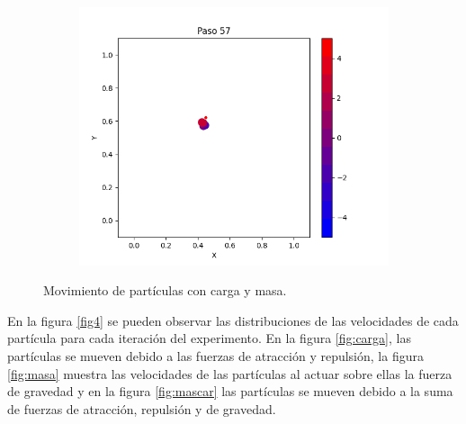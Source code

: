 \documentclass{report}
\begin{document}
\begin{figure}[h]
\begin{subfigure}[b]{0.3\textwidth}
         \includegraphics[width=\textwidth]{Images/Images_mc/p9pmc_t57.png}
     \end{subfigure}
     \caption{Movimiento de part\'iculas con carga y masa.}
     \label{fig3}
\end{figure}

\newpage

En la figura \ref{fig4} se pueden observar las distribuciones de las velocidades de cada part\'icula para cada iteraci\'on del experimento. En la figura \ref{fig:carga}, las part\'iculas se mueven debido a las fuerzas de atracci\'on y repulsi\'on, la figura \ref{fig:masa} muestra las velocidades de las part\'iculas al actuar sobre ellas la fuerza de gravedad y en la figura \ref{fig:mascar} las part\'iculas se mueven debido a la suma de fuerzas de atracci\'on, repulsi\'on y de gravedad.
\end{document}
